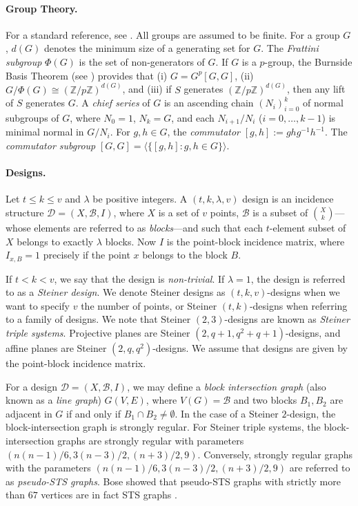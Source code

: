 \documentclass{article}
\begin{document}
\paragraph{Group Theory.} For a standard reference, see \cite{Robinson1982}. All groups are assumed to be finite. For a group $G$, $d(G)$ denotes the minimum size of a generating set for $G$. The \textit{Frattini subgroup} $\Phi(G)$ is the set of non-generators of $G$. If $G$ is a $p$-group, the Burnside Basis Theorem (see \cite[Theorem 5.3.2]{Robinson1982}) provides that (i) $G = G^{p}[G,G]$, (ii) $G/\Phi(G) \cong (\mathbb{Z}/p\mathbb{Z})^{d(G)}$, and (iii) if $S$ generates $(\mathbb{Z}/p\mathbb{Z})^{d(G)}$, then any lift of $S$ generates $G$. A \textit{chief series} of $G$ is an ascending chain $(N_{i})_{i=0}^{k}$ of normal subgroups of $G$, where $N_{0} = 1$, $N_{k} = G$, and each $N_{i+1}/N_{i}$ ($i = 0, \ldots, k-1$) is minimal normal in $G/N_{i}$. 
For $g, h \in G$, the \textit{commutator} $[g,h] := ghg^{-1}h^{-1}$. The \textit{commutator subgroup} $[G,G] = \langle \{ [g,h] : g,h \in G \} \rangle$.

\paragraph{Designs.} Let $t \leq k \leq v$ and $\lambda$ be positive integers. A $(t, k, \lambda, v)$ design is an incidence structure $\mathcal{D} = (X, \mathcal{B}, I)$, where $X$ is a set of $v$ points, $\mathcal{B}$ is a subset of $\binom{X}{k}$---whose elements are referred to as \textit{blocks}---and such that each $t$-element subset of $X$ belongs to exactly $\lambda$ blocks. Now $I$ is the point-block incidence matrix, where $I_{x,B} = 1$ precisely if the point $x$ belongs to the block $B$.

If $t < k < v$, we say that the design is \textit{non-trivial}. If $\lambda = 1$, the design is referred to as a \textit{Steiner design}. We denote Steiner designs as $(t, k, v)$-designs when we want to specify $v$ the number of points, or Steiner $(t, k)$-designs when referring to a family of designs. We note that Steiner $(2, 3)$-designs are known as \textit{Steiner triple systems}. Projective planes are Steiner $(2, q+1, q^{2} + q + 1)$-designs, and affine planes are Steiner $(2, q, q^{2})$-designs. We assume that designs are given by the point-block incidence matrix. 


For a design $\mathcal{D} = (X, \mathcal{B}, I)$, we may define a \textit{block intersection graph} (also known as a \textit{line graph}) $G(V, E)$, where $V(G) = \mathcal{B}$ and two blocks $B_{1}, B_{2}$ are adjacent in $G$ if and only if $B_{1} \cap B_{2} \neq \emptyset$. In the case of a Steiner $2$-design, the block-intersection graph is strongly regular. For Steiner triple systems, the block-intersection graphs are strongly regular with parameters $(n(n-1)/6, 3(n-3)/2, (n+3)/2, 9)$. Conversely, strongly regular graphs with the parameters $(n(n-1)/6, 3(n-3)/2, (n+3)/2, 9)$ are referred to as \textit{pseudo-STS graphs}. Bose showed that pseudo-STS graphs with strictly more than $67$ vertices are in fact STS graphs \cite{Bose}. 
\end{document}
